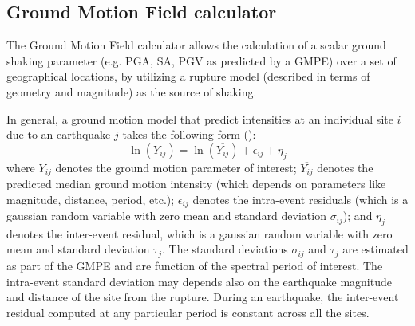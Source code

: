 \subsection{Ground Motion Field calculator}
The Ground Motion Field calculator allows the calculation of a scalar ground 
shaking parameter (e.g. PGA, SA, PGV as predicted by a GMPE) over a set of 
geographical locations, by utilizing a rupture model (described in terms of
geometry and magnitude) as the source of shaking.

In general, a ground motion model that predict intensities at an individual
site $i$ due to an earthquake $j$ takes the following form (\cite{jayaram2009}):
%
\begin{equation}
\ln (Y_{ij}) = \ln (\overline{Y_{ij}})+\epsilon_{ij}+\eta_{j}
\label{gmfeq}
\end{equation}
%
where $Y_{ij}$ denotes the ground motion parameter of interest; 
$\overline{Y_{ij}}$ denotes the predicted median ground motion 
intensity (which depends on parameters like magnitude, distance, 
period, etc.); $\epsilon_{ij}$ denotes the intra-event residuals 
(which is a gaussian random variable with zero mean and standard 
deviation $\sigma_{ij}$); and $\eta_{j}$ denotes the inter-event 
residual, which is a gaussian random variable with zero mean and 
standard deviation $\tau_{j}$. The standard deviations $\sigma_{ij}$ 
and $\tau_{j}$ are estimated as part of the GMPE and are function of 
the spectral period of interest. The intra-event standard deviation 
may depends also on the earthquake magnitude and distance of the site 
from the rupture. During an earthquake, the inter-event residual computed
at any particular period is constant across all the sites.

